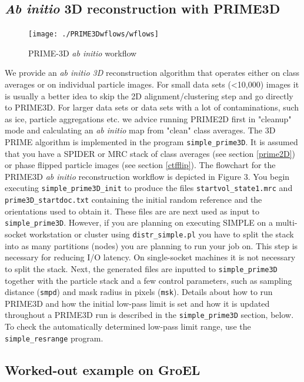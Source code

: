 \documentclass[a4paper,11pt]{article}
\newcommand{\prgname}[1]{\textcolor{NavyBlue}{\texttt{#1}}}
\begin{document}
\subsection{\textit{Ab initio} 3D reconstruction with PRIME3D}
\label{prime3D}
\begin{figure}
\texttt{[image: ./PRIME3Dwflows/wflows]}
\caption{PRIME-3D \textit{ab initio} workflow}
\end{figure}
We provide an \textit{ab initio 3D} reconstruction algorithm that operates either on class averages or on individual particle images. For small data sets (<10,000) images it is usually a better idea to skip the 2D alignment/clustering step and go directly to PRIME3D. For larger data sets or data sets with a lot of contaminations, such as ice, particle aggregations etc. we advice running PRIME2D first in "cleanup" mode and calculating an \textit{ab initio} map from "clean" class averages. The 3D PRIME algorithm is implemented in the program \prgname{simple\_prime3D}. It is assumed that you have a SPIDER or MRC stack of class averages (see section \ref{prime2D}) or phase flipped particle images (see section \ref{ctfflip}). The flowchart for the PRIME3D \textit{ab initio} reconstruction workflow is depicted in Figure 3. You begin executing \prgname{simple\_prime3D\_init} to produce the files \texttt{startvol\_state1.mrc} and \texttt{prime3D\_startdoc.txt} containing the initial random reference and the orientations used to obtain it. These files are are next used as input to \prgname{simple\_prime3D}. However, if you are planning on executing SIMPLE on a multi-socket workstation or cluster using \prgname{distr\_simple.pl} you have to split the stack into as many partitions (nodes) you are planning to run your job on. This step is necessary for reducing I/O latency. On single-socket machines it is not necessary to split the stack. Next, the generated files are inputted to \prgname{simple\_prime3D} together with the particle stack and a few control parameters, such as sampling distance (\texttt{smpd}) and mask radius in pixels (\texttt{msk}). Details about how to run PRIME3D and how the initial low-pass limit is set and how it is updated throughout a PRIME3D run is described in the \prgname{simple\_prime3D} section, below. To check the automatically determined low-pass limit range, use the \prgname{simple\_resrange} program.

\subsection{Worked-out example on GroEL}
\end{document}
